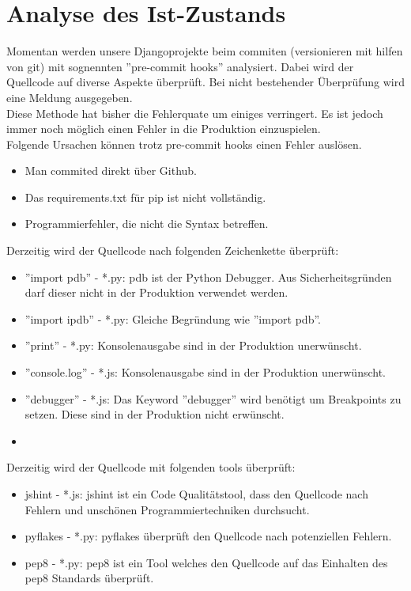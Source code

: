 \section{Analyse des Ist-Zustands}
Momentan werden unsere Djangoprojekte beim commiten (versionieren mit hilfen von git) mit sognennten ''pre-commit hooks'' analysiert. 
Dabei wird der Quellcode auf diverse Aspekte überprüft. Bei nicht bestehender Überprüfung wird eine Meldung ausgegeben.\\
Diese Methode hat bisher die Fehlerquate um einiges verringert. Es ist jedoch immer noch möglich einen Fehler in die Produktion einzuspielen. \\  
Folgende Ursachen können trotz pre-commit hooks einen Fehler auslösen. 
\begin{itemize}
    \item Man commited direkt über Github.
    \item Das requirements.txt für pip ist nicht vollständig.
    \item Programmierfehler, die nicht die Syntax betreffen. 
\end{itemize}
Derzeitig wird der Quellcode nach folgenden Zeichenkette überprüft:
\begin{itemize}
    \item ''import pdb'' - *.py: 
        pdb ist der Python Debugger. Aus Sicherheitsgründen darf dieser nicht in der Produktion verwendet werden.
    \item ''import ipdb'' - *.py:
        Gleiche Begründung wie ''import pdb''.
    \item ''print'' - *.py:
        Konsolenausgabe sind in der Produktion unerwünscht.
    \item ''console.log'' - *.js:
        Konsolenausgabe sind in der Produktion unerwünscht.
    \item ''debugger'' - *.js:
        Das Keyword ''debugger'' wird benötigt um Breakpoints zu setzen. Diese sind in der Produktion nicht erwünscht.
    \item 
\end{itemize}
Derzeitig wird der Quellcode mit folgenden tools überprüft:
\begin{itemize}
    \item jshint - *.js:
        jshint ist ein Code Qualitätstool, dass den Quellcode nach Fehlern und unschönen Programmiertechniken durchsucht.
    \item pyflakes - *.py:
        pyflakes überprüft den Quellcode nach potenziellen Fehlern.
    \item pep8 - *.py:
        pep8 ist ein Tool welches den Quellcode auf das Einhalten des pep8 Standards überprüft.
\end{itemize}

